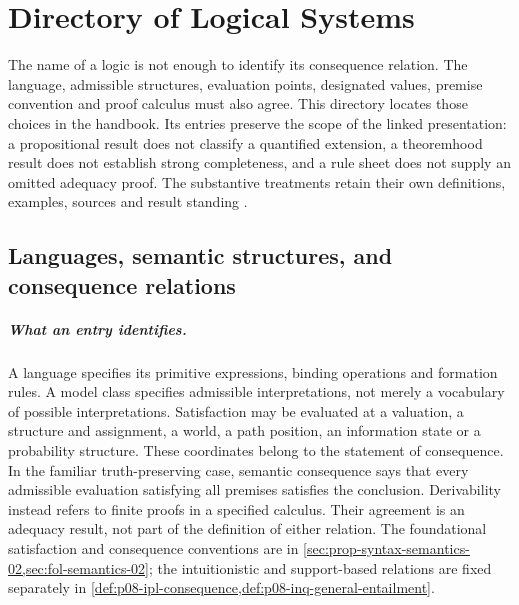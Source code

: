 \chapter{Directory of Logical Systems}
\label{sec:p14-directory-of-logical-systems}

The name of a logic is not enough to identify its consequence relation.
The language, admissible structures, evaluation points, designated values,
premise convention and proof calculus must also agree. This directory
locates those choices in the handbook. Its entries preserve the scope of
the linked presentation: a propositional result does not classify a
quantified extension, a theoremhood result does not establish strong
completeness, and a rule sheet does not supply an omitted adequacy proof.
The substantive treatments retain their own definitions, examples,
sources and result standing \cite{Enderton2001,Manzano1996,
TroelstraSchwichtenberg2000,BlackburnDeRijkeVenema2001}.

\section{Languages, semantic structures, and consequence relations}
\label{sec:p14-directory-interfaces}

\paragraph{What an entry identifies.}
A language specifies its primitive expressions, binding operations and
formation rules. A model class specifies admissible interpretations, not
merely a vocabulary of possible interpretations. Satisfaction may be
evaluated at a valuation, a structure and assignment, a world, a path
position, an information state or a probability structure. These coordinates
belong to the statement of consequence. In the familiar truth-preserving
case, semantic consequence says that every admissible evaluation satisfying
all premises satisfies the conclusion. Derivability instead refers to
finite proofs in a specified calculus. Their agreement is an adequacy
result, not part of the definition of either relation. The foundational
satisfaction and consequence conventions are in
\cref{sec:prop-syntax-semantics-02,sec:fol-semantics-02}; the
intuitionistic and support-based relations are fixed separately in
\cref{def:p08-ipl-consequence,def:p08-inq-general-entailment}.

